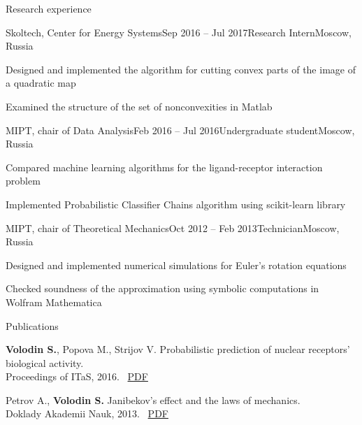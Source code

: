 \documentclass{resume} %
\begin{document}
\begin{rSection}{Research experience}
	\begin{rSubsection}{Skoltech, Center for Energy Systems}{Sep 2016 -- Jul 2017}{Research Intern}{Moscow, Russia}
		\item Designed and implemented the algorithm for cutting convex parts of the image of a quadratic map
		\item Examined the structure of the set of nonconvexities in Matlab
	\end{rSubsection}
	
	\begin{rSubsection}{MIPT, chair of Data Analysis}{Feb 2016 -- Jul 2016}{Undergraduate student}{Moscow, Russia}
		\item Compared machine learning algorithms for the ligand-receptor interaction problem
		\item Implemented Probabilistic Classifier Chains algorithm using scikit-learn library
	\end{rSubsection}
	
	\begin{rSubsection}{MIPT, chair of Theoretical Mechanics}{Oct 2012 -- Feb 2013}{Technician}{Moscow, Russia}
		\item Designed and implemented numerical simulations for Euler's rotation equations
		\item Checked soundness of the approximation using symbolic computations in Wolfram Mathematica
	\end{rSubsection}
\end{rSection}

\begin{rSection}{Publications}
\item {\bf Volodin S.}, Popova M., Strijov V. Probabilistic prediction of nuclear receptors’ biological activity.\\ Proceedings of ITaS, 2016. \faExternalLink~\href{http://itas2016.iitp.ru/pdf/1570303389.pdf}{PDF}
\item Petrov A., {\bf Volodin S.} Janibekov’s effect and the laws of mechanics.\\ Doklady Akademii Nauk, 2013. \faExternalLink~\href{https://link.springer.com/article/10.1134/S1028335813080041}{PDF}
\end{rSection}
\end{document}
